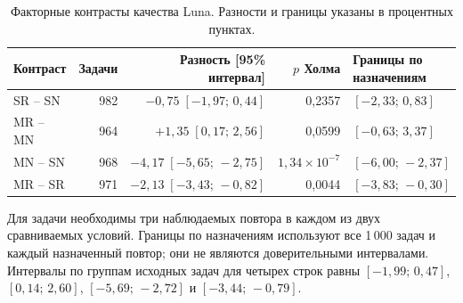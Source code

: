 \begin{table}[H]\centering
\caption{Факторные контрасты качества Luna. Разности и границы указаны в процентных пунктах.}
\label{tab:scale-contrasts}
\small
\begin{tabular}{@{}lrrrl@{}}\toprule
Контраст & Задачи & Разность [95\% интервал] & $p$ Холма & Границы по назначениям\\\midrule
SR -- SN & 982 & $-0{,}75\;[-1{,}97;\,0{,}44]$ & 0,2357 & $[-2{,}33;\,0{,}83]$\\
MR -- MN & 964 & $+1{,}35\;[0{,}17;\,2{,}56]$ & 0,0599 & $[-0{,}63;\,3{,}37]$\\
MN -- SN & 968 & $-4{,}17\;[-5{,}65;\,-2{,}75]$ & $1{,}34\!\times\!10^{-7}$ & $[-6{,}00;\,-2{,}37]$\\
MR -- SR & 971 & $-2{,}13\;[-3{,}43;\,-0{,}82]$ & 0,0044 & $[-3{,}83;\,-0{,}30]$\\
\bottomrule\end{tabular}
\par\smallskip\noindent Для задачи необходимы три наблюдаемых повтора в каждом из двух сравниваемых условий. Границы по назначениям используют все 1\,000 задач и каждый назначенный повтор; они не являются доверительными интервалами. Интервалы по группам исходных задач для четырех строк равны $[-1{,}99;\,0{,}47]$, $[0{,}14;\,2{,}60]$, $[-5{,}69;\,-2{,}72]$ и $[-3{,}44;\,-0{,}79]$.
\end{table}

